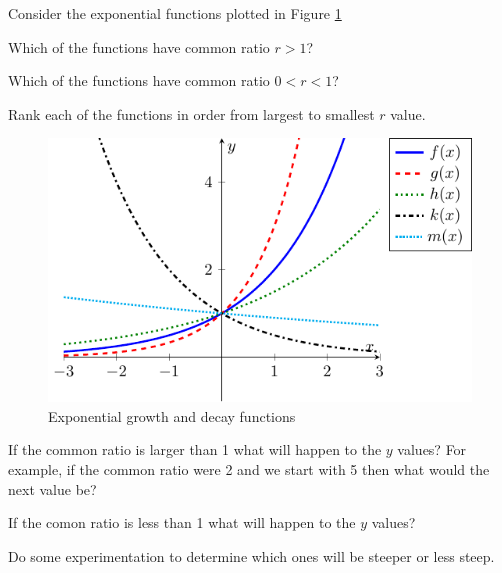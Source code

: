 \begin{activity}\label{A:0.2.1}
    Consider the exponential functions plotted in Figure \ref{F:0.2.Act1}
    \ba
        \item Which of the functions have common ratio $r > 1$?
        \item Which of the functions have common ratio $0<r< 1$?
        \item Rank each of the functions in order from largest to smallest $r$ value.
    \ea
    \begin{figure}[h!]
        \begin{center}
            \includegraphics[width=0.6\columnwidth]{figures/0-2-figAct1.pdf}
        \end{center}
        \caption{Exponential growth and decay functions} \label{F:0.2.Act1}
    \end{figure}
\end{activity}
\begin{smallhint}
   \ba
        \item If the common ratio is larger than 1 what will happen to the $y$ values?
            For example, if the common ratio were 2 and we start with 5 then what would
            the next value be?
        \item If the comon ratio is less than 1 what will happen to the $y$ values?
        \item Do some experimentation to determine which ones will be steeper or less
            steep.
   \ea
\end{smallhint}
